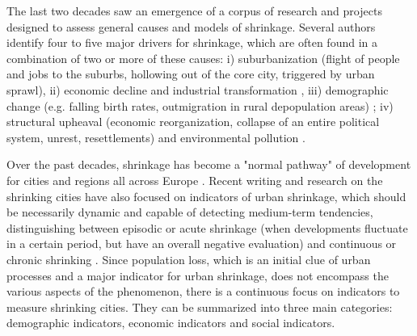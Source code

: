 The last two decades saw an emergence of a corpus of research and projects designed to assess general causes and models of shrinkage. Several authors identify four to five major drivers for shrinkage, which are often found in a combination of two or more of these causes: i) suburbanization (flight of people and jobs to the suburbs, hollowing out of the core city, triggered by urban sprawl)\citep{wiechmann_types_2006, wiechmann_responding_2015, cunningham-sabot_theoretical_2014, audirac_shrinking_2014, reckien_why_2011, wiechmann_responding_2015}, ii) economic decline and industrial transformation \citep{wiechmann_types_2006, rink_addressing_2010, haase_conceptualizing_2014}, iii) demographic change (e.g. falling birth rates, outmigration in rural depopulation areas) \citep{rink_addressing_2010, haase_conceptualizing_2014, wiechmann_responding_2015}; iv) structural upheaval (economic reorganization, collapse of an entire political system, unrest, resettlements) and environmental pollution \citep{wiechmann_types_2006, haase_conceptualizing_2014, cunningham-sabot_theoretical_2014, wiechmann_responding_2015}.

Over the past decades, shrinkage has become a "normal pathway" of development for cities and regions all across Europe \citep{rink_addressing_2010}. Recent writing and research on the shrinking cities have also focused on indicators of urban shrinkage, which should be necessarily dynamic and capable of detecting medium-term tendencies, distinguishing between episodic or acute shrinkage (when developments fluctuate in a certain period, but have an overall negative evaluation) and continuous or chronic shrinking \citep{wolff_indicators_2014}. Since population loss, which is an initial clue of urban processes and a major indicator for urban shrinkage, does not encompass the various aspects of the phenomenon, there is a continuous focus on indicators to measure shrinking cities. They can be summarized into three main categories: demographic indicators, economic indicators and social indicators.

